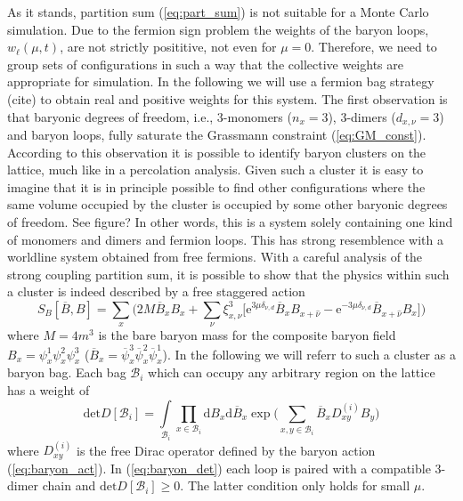 \documentclass{PoS}
\begin{document}
As it stands, partition sum (\ref{eq:part_sum}) is not suitable for a Monte Carlo simulation. Due to the fermion sign problem the weights of the baryon loops, $w_{\ell}(\mu,t)$, are not strictly posititive, not even for $\mu = 0$. Therefore, we need to group sets of configurations in such a way that the collective weights are appropriate for simulation. In the following we will use a fermion bag strategy (cite) to obtain real and positive weights for this system. The first observation is that baryonic degrees of freedom, i.e., 3-monomers ($n_x = 3$), 3-dimers ($d_{x,\nu}=3$) and baryon loops, fully saturate the Grassmann constraint (\ref{eq:GM_const}). According to this observation it is possible to identify baryon clusters on the lattice, much like in a percolation analysis. Given such a cluster it is easy to imagine that it is in principle possible to find other configurations where the same volume occupied by the cluster is occupied by some other baryonic degrees of freedom. See figure? In other words, this is a system solely containing one kind of monomers and dimers and fermion loops. This has strong resemblence with a worldline system obtained from free fermions. With a careful analysis of the strong coupling partition sum, it is possible to show that the physics within such a cluster is indeed described by a free staggered action 
\begin{equation}
S_B\left[\overline{B},B\right] = \sum_x\Big(2M\overline{B}_x B_x +\sum_{\nu} \xi_{x,\nu}^3\Big[ \text{e}^{3\mu\delta_{\nu,d}}\overline{B}_{x} B_{x+\hat{\nu}} - \text{e}^{-3\mu\delta_{\nu,d}}\overline{B}_{x+\hat{\nu}}B_{x} \Big] \Big)
\label{eq:baryon_act}
\end{equation}
where $M = 4m^3$ is the bare baryon mass for the composite baryon field $B_x = \psi^{1}_x\psi^{2}_x\psi^{3}_x$ ($\overline{B}_x = \overline{\psi}^{3}_x\overline{\psi}^{2}_x\overline{\psi}^{1}_x$). In the following we will referr to such a cluster as a baryon bag. Each bag $\mathcal{B}_i$ which can occupy any arbitrary region on the lattice has a weight of
\begin{equation}
\text{det} D[\mathcal{B}_i]  = \int\limits_{\mathcal{B}_i} \prod_{x\in\mathcal{B}_i} \text{d} B_x \text{d}\overline{B}_x \exp\Big(\sum\limits_{x,y \in \mathcal{B}_i} \overline{B}_x D^{(i)}_{xy} B_y\Big)
\label{eq:baryon_det}
\end{equation}
where $D^{(i)}_{xy}$ is the free Dirac operator defined by the baryon action (\ref{eq:baryon_act}). In (\ref{eq:baryon_det}) each loop is paired with a compatible 3-dimer chain and $\text{det} D[\mathcal{B}_i] \geq 0$. The latter condition only holds for small $\mu$.\\
\end{document}
